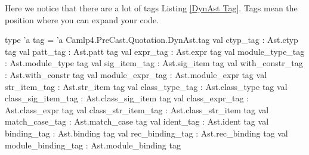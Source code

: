 
    



Here we notice that there are a lot of tags Listing \ref{DynAst
  Tag}. Tags mean the position where you can expand your code.

\begin{ocamlcode}
    type 'a tag = 'a Camlp4.PreCast.Quotation.DynAst.tag
    val ctyp_tag : Ast.ctyp tag
    val patt_tag : Ast.patt tag
    val expr_tag : Ast.expr tag
    val module_type_tag : Ast.module_type tag
    val sig_item_tag : Ast.sig_item tag
    val with_constr_tag : Ast.with_constr tag
    val module_expr_tag : Ast.module_expr tag
    val str_item_tag : Ast.str_item tag
    val class_type_tag : Ast.class_type tag
    val class_sig_item_tag : Ast.class_sig_item tag
    val class_expr_tag : Ast.class_expr tag
    val class_str_item_tag : Ast.class_str_item tag
    val match_case_tag : Ast.match_case tag
    val ident_tag : Ast.ident tag
    val binding_tag : Ast.binding tag
    val rec_binding_tag : Ast.rec_binding tag
    val module_binding_tag : Ast.module_binding tag
\end{ocamlcode}




